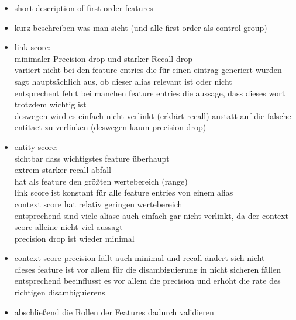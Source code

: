 \begin{itemize}
	\item short description of first order features
	\item kurz beschreiben was man sieht (und alle first order als control group)
	\item link score:\\
		minimaler Precision drop und starker Recall drop\\
		variiert nicht bei den feature entries die für einen eintrag generiert wurden\\
		sagt hauptsächlich aus, ob dieser alias relevant ist oder nicht\\
		entsprechent fehlt bei manchen feature entries die aussage, dass dieses wort trotzdem wichtig ist\\
		deswegen wird es einfach nicht verlinkt (erklärt recall) anstatt auf die falsche entitaet zu verlinken (deswegen kaum precision drop)
	\item entity score:\\
		sichtbar dass wichtigstes feature überhaupt\\
		extrem starker recall abfall\\
		hat als feature den größten wertebereich (range)\\
		link score ist konstant für alle feature entries von einem alias\\
		context score hat relativ geringen wertebereich\\
		entsprechend sind viele aliase auch einfach gar nicht verlinkt, da der context score alleine nicht viel aussagt\\
		precision drop ist wieder minimal
	\item context score
		precision fällt auch minimal und recall ändert sich nicht\\
		dieses feature ist vor allem für die disambiguierung in nicht sicheren fällen\\
		entsprechend beeinflusst es vor allem die precision und erhöht die rate des richtigen disambiguierens
	\item abschließend die Rollen der Features dadurch validieren
\end{itemize}

